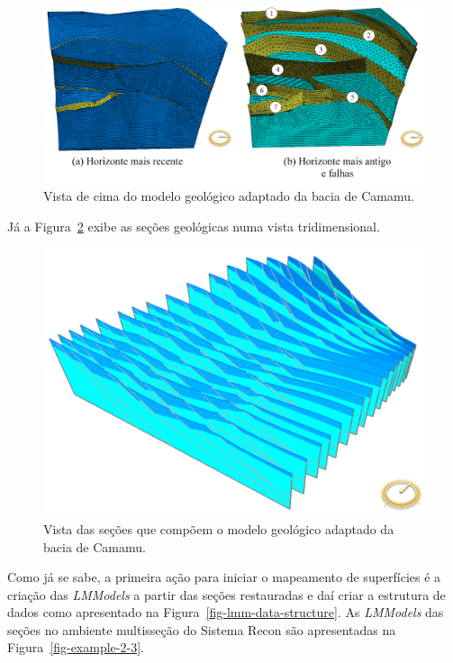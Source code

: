 \begin{figure} [H]
  \begin{center}
    \includegraphics[width=\textwidth]{images/fig-example-2-1}
    \caption{Vista de cima do modelo geológico adaptado da bacia de Camamu.}\label{fig-example-2-1}
  \end{center}
\end{figure}

Já a Figura~\ref{fig-example-2-2} exibe as seções geológicas numa vista tridimensional.

\begin{figure} [H]
  \begin{center}
    \includegraphics[width=320pt]{images/fig-example-2-2}
    \caption{Vista das seções que compõem o modelo geológico adaptado da bacia de Camamu.}\label{fig-example-2-2}
  \end{center}
\end{figure}

Como já se sabe, a primeira ação para iniciar o mapeamento de superfícies é a criação das \textit{LMModels} a partir das seções restauradas e daí criar a estrutura de dados como apresentado na Figura~\ref{fig-lmm-data-structure}. As \textit{LMModels} das seções no ambiente multisseção do Sistema Recon são apresentadas na Figura~\ref{fig-example-2-3}.

